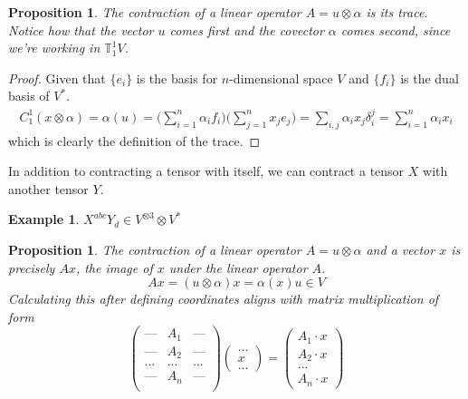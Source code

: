 \documentclass{article}
\newtheorem{proposition}[theorem]{Proposition}
\newtheorem{example}{Example}[section]
\theoremstyle{remark}
\theoremstyle{definition}
\begin{document}
\begin{proposition}
The contraction of a linear operator $A = u \otimes \alpha$ is its trace. Notice how that the vector $u$ comes first and the covector $\alpha$ comes second, since we're working in $\mathbb{T}^1_1 V$. 
\end{proposition}
\begin{proof}
Given that $\{e_i\}$ is the basis for $n$-dimensional space $V$ and $\{f_i\}$ is the dual basis of $V^*$.
\begin{align*}
    C^1_1 (x \otimes \alpha) = \alpha (u) 
    = \Big( \sum_{i=1}^n \alpha_i f_i  \Big) \Big( \sum_{j=1}^n x_j e_j \Big)  = \sum_{i, j} \alpha_i x_j \delta^j_i = \sum_{i=1}^n \alpha_i x_i 
\end{align*}
which is clearly the definition of the trace. 
\end{proof}

In addition to contracting a tensor with itself, we can contract a tensor $X$ with another tensor $Y$. 

\begin{example}
$X^{a b c} Y_d \in V^{\otimes 3} \otimes V^*$ 
\end{example}

\begin{proposition}
The contraction of a linear operator $A = u \otimes \alpha$ and a vector $x$ is precisely $A x$, the image of $x$ under the linear operator $A$. 
\[A x = (u \otimes \alpha) x = \alpha (x) u \in V\]
Calculating this after defining coordinates aligns with matrix multiplication of form
\[\begin{pmatrix}
\text{---} & A_1 & \text{---} \\
\text{---} & A_2 & \text{---} \\
... & ... & ... \\
\text{---} & A_n & \text{---} \\
\end{pmatrix} \begin{pmatrix}
... \\ x \\ ... 
\end{pmatrix} = \begin{pmatrix}
 A_1 \cdot x \\ A_2 \cdot x \\ ... \\ A_n \cdot x
\end{pmatrix}\]
\end{proposition}
\end{document}
